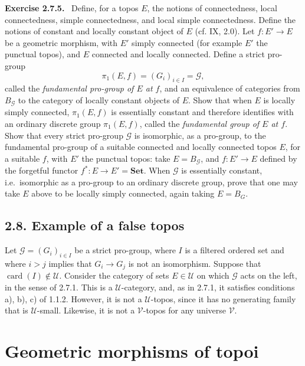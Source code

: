\documentclass[11pt]{article}
\newcommand{\U}{\mathcal{U}}
\newcommand{\V}{\mathcal{V}}
\newcommand{\G}{\mathcal{G}}
\newcommand{\Set}{\mathbf{Set}}
\newcommand{\ie}{i.e.}
\newenvironment{remarktext}[1]{\par\medskip\noindent\textbf{#1.}\ }{\par\medskip}
\begin{document}
\begin{remarktext}{Exercise 2.7.5}
Define, for a topos \(E\), the notions of connectedness, local connectedness, simple connectedness, and local simple connectedness. Define the notions of constant and locally constant object of \(E\) (cf. IX, 2.0). Let \(f:E'\to E\) be a geometric morphism, with \(E'\) simply connected (for example \(E'\) the punctual topos), and \(E\) connected and locally connected. Define a strict pro-group
\[
\pi_1(E,f)=(G_i)_{i\in I}=\G,
\]
called the \emph{fundamental pro-group of \(E\) at \(f\)}, and an equivalence of categories from \(B_\G\) to the category of locally constant objects of \(E\). Show that when \(E\) is locally simply connected, \(\pi_1(E,f)\) is essentially constant and therefore identifies with an ordinary discrete group \(\pi_1(E,f)\), called the \emph{fundamental group of \(E\) at \(f\)}. Show that every strict pro-group \(\G\) is isomorphic, as a pro-group, to the fundamental pro-group of a suitable connected and locally connected topos \(E\), for a suitable \(f\), with \(E'\) the punctual topos: take \(E=B_\G\), and \(f:E'\to E\) defined by the forgetful functor \(f^\ast:E\to E'=\Set\). When \(\G\) is essentially constant, \ie\ isomorphic as a pro-group to an ordinary discrete group, prove that one may take \(E\) above to be locally simply connected, again taking \(E=B_G\).
\end{remarktext}

\subsection*{2.8. Example of a false topos}
Let \(\G=(G_i)_{i\in I}\) be a strict pro-group, where \(I\) is a filtered ordered set and where \(i>j\) implies that \(G_i\to G_j\) is not an isomorphism. Suppose that \(\operatorname{card}(I)\notin\U\). Consider the category of sets \(E\in\U\) on which \(\G\) acts on the left, in the sense of 2.7.1. This is a \(\U\)-category, and, as in 2.7.1, it satisfies conditions a), b), c) of 1.1.2. However, it is not a \(\U\)-topos, since it has no generating family that is \(\U\)-small. Likewise, it is not a \(\V\)-topos for any universe \(\V\).

\section{Geometric morphisms of topoi}
\end{document}
